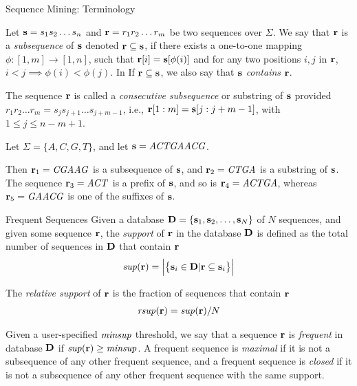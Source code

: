 \begin{frame}{Sequence Mining: Terminology}

  Let $\mathbf{s} = s_1s_2 \ldots s_{n}$ and $\mathbf{r} = r_1r_2 \ldots r_{m}$ be two
sequences over $\Sigma$.  We say that $\mathbf{r}$ is a {\em subsequence} of
$\mathbf{s}$ denoted $\mathbf{r} \subseteq \mathbf{s}$, if there exists a one-to-one mapping
$\phi: [1,m] \to [1,n]$, such that $\mathbf{r}[i] = \mathbf{s}[\phi(i)]$ and for any
two positions $i,j$ in $\mathbf{r}$, $i < j \implies \phi(i) < \phi(j)$. In
If $\mathbf{r} \subseteq \mathbf{s}$, we also say that $\mathbf{s}$ {\em contains} $\mathbf{r}$.

\medskip
The sequence $\mathbf{r}$ is called a {\em consecutive subsequence} or
substring of $\mathbf{s}$ provided $r_1r_2\ldots r_{m} = s_{j}s_{j+1}\ldots
s_{j+m-1}$, i.e., $\mathbf{r}[1:m] =\mathbf{s}[j:j+m-1]$, with $1\le j \le n-m+1$.

\begin{block}

Let $\Sigma = \{A,C,G,T\}$, and let $\mathbf{s} = \mathit{ACTGAACG}$.  

Then
$\mathbf{r}_1=\mathit{CGAAG}$ is a subsequence of $\mathbf{s}$, and $\mathbf{r}_2=\mathit{CTGA}$ is a substring
of $\mathbf{s}$.  The sequence $\mathbf{r}_3=\mathit{ACT}$ is a pref\/{i}x of $\mathbf{s}$, and so is
$\mathbf{r}_4=\mathit{ACTGA}$, whereas $\mathbf{r}_5=\mathit{GAACG}$ is one of the suff\/{i}xes of $\mathbf{s}$.
\end{block}%
\end{frame}
%

\begin{frame}{Frequent Sequences}
Given a database $\mathbf{D} = \{\mathbf{s}_1,\mathbf{s}_2, \ldots, \mathbf{s}_N\}$ of $N$
sequences, and given some sequence $\mathbf{r}$, the {\em support} of $\mathbf{r}$ in
the database $\mathbf{D}$ is def\/{i}ned as the total number of sequences in $\mathbf{D}$
that contain $\mathbf{r}$
\begin{align*}
  \mathit{sup}(\mathbf{r}) = \Big| \bigl\{\mathbf{s}_i \in \mathbf{D} | \mathbf{r} \subseteq
  \mathbf{s}_i\bigr\} \Big|
\end{align*}

\medskip
The {\em relative support} of $\mathbf{r}$ is the fraction of sequences that
contain $\mathbf{r}$
\begin{align*}
  \mathit{rsup}(\mathbf{r}) = \mathit{sup}(\mathbf{r})/N
\end{align*}

\medskip
Given a user-specif\/{i}ed $\mathit{minsup}$ threshold, we say that a sequence $\mathbf{r}$
is {\em frequent} in database $\mathbf{D}$ if $\mathit{sup}(\mathbf{r}) \ge \mathit{minsup}$.  A
frequent sequence is {\em maximal} if it is not a subsequence of any
other frequent sequence, and a frequent sequence is {\em closed} if it
is not a subsequence of any other frequent sequence with the same
support.

\end{frame}



